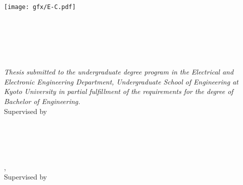 %


\begin{titlepage}
	\centering

	{\Large \thesisUniversity} \\[4mm]
	\texttt{[image: gfx/E-C.pdf]} \\[2mm]
	\textsf{\thesisUniversitySchool} \\
	\textsf{\thesisUniversityDepartment} \\ [30mm]


	{\large \thesisSubject} \\[5mm]
	{\LARGE \textbf{\thesisTitle} \\[10mm]}
	{\Large \thesisName} \\

	\hspace*{15pt}

	\emph{Thesis submitted to the undergraduate degree program in the Electrical and Electronic Engineering Department, Undergraduate School of Engineering at Kyoto University in partial fulfillment of the requirements for the degree of \\ Bachelor of Engineering.} \\ [15mm]


	Supervised by \thesisSupervisor \\[3mm]
	\thesisUniversityGroup \\[3mm]
	
	\thesisDate \\

\end{titlepage}


\hfill
\vfill
{
	\small
	\textbf{\thesisName} \\
	\textit{\thesisTitle} \\
	\thesisSubject, \thesisDate \\
	Supervised by \thesisSupervisor \\[1.5em]
	\textbf{\thesisUniversity} \\

	\thesisUniversityDepartment \\
	\thesisUniversitySchool \\
}